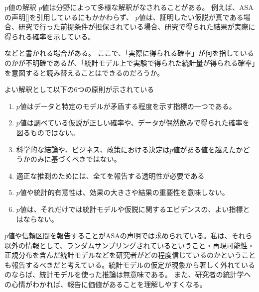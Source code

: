 \begin{SMbox}{p値の解釈}
$p$値は分野によって多様な解釈がなされることがある\cite{published_papers/18436201,2020医療統計解析使いこなし実践ガイド}。
例えば、ASAの声明[\cite{ASA_JA}]を引用しているにもかかわらず、
$p$値は、証明したい仮説が真である場合、研究で行った前提条件が担保されている場合、研究で得られた結果が実際に得られる確率を示している\cite{2020医療統計解析使いこなし実践ガイド}。

などと書かれる場合がある。
ここで、「実際に得られる確率」が何を指しているのかが不明確であるが、「統計モデル上で実験で得られた統計量が得られる確率」を意図すると読み替えることはできるのだろうか。
\fi

よい解釈として以下の6つの原則が示されている\cite{published_papers/18436201}
\begin{enumerate}
    \item $p$値はデータと特定のモデルが矛盾する程度を示す指標の一つである。
    \item $p$値は調べている仮説が正しい確率や、データが偶然飲みで得られた確率を図るものではない。
    \item 科学的な結論や、ビジネス、政策における決定は$p$値がある値を越えたかどうかのみに基づくべきではない。
    \item 適正な推測のためには、全てを報告する透明性が必要である
    \item $p$値や統計的有意性は、効果の大きさや結果の重要性を意味しない。
    \item $p$値は、それだけでは統計モデルや仮説に関するエビデンスの、よい指標とはならない。
\end{enumerate}

    $p$値や信頼区間を報告することがASAの声明では求められている。私は、それら以外の情報として、ランダムサンプリングされているということ・再現可能性・正規分布を含んだ統計モデルなどを研究者がどの程度信じているのかということも報告するべきだと考えている。統計モデルの仮定が現象から著しく外れているのならば、統計モデルを使った推論は無意味である。
    また、研究者の統計学への心情がわかれば、報告に価値があることを理解しやすくなる。
\fi 
\end{SMbox}

